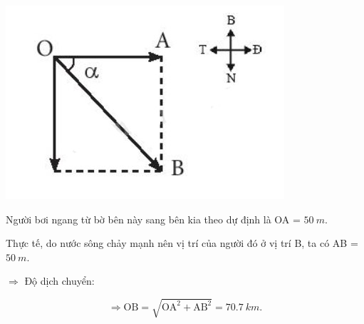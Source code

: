 \begin{enumerate}[label=\bfseries Bài \arabic*:]
\hideall
{
	\begin{center}
		\includegraphics[scale=0.6]{../figs/VN10-2022-PH-TP0001-2.jpg}
	\end{center}
	Người bơi ngang từ bờ bên này sang bên kia theo dự định là OA = $\SI{50}{m}$.
	
	Thực tế, do nước sông chảy mạnh nên vị trí của người đó ở vị trí B, ta có AB = $\SI{50}{m}$.
	
	$\Rightarrow$ Độ dịch chuyển:
	
	$$\Rightarrow\text{OB} = \sqrt{\text{OA}^2 + \text{AB}^2} = \SI{70,7}{km}.$$ 
}
\end{enumerate}